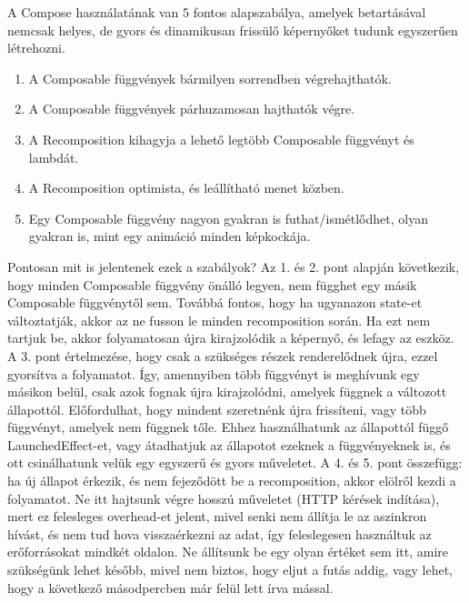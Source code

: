A Compose használatának van 5 fontos alapszabálya, amelyek betartásával nemcsak helyes, de gyors és dinamikusan frissülő képernyőket tudunk egyszerűen létrehozni.  
\begin{enumerate}
    \item A Composable függvények bármilyen sorrendben végrehajthatók.  
    \item A Composable függvények párhuzamosan hajthatók végre.  
    \item A Recomposition kihagyja a lehető legtöbb Composable függvényt és lambdát.  
    \item A Recomposition optimista, és leállítható menet közben.  
    \item Egy Composable függvény nagyon gyakran is futhat/ismétlődhet, olyan gyakran is, mint egy animáció minden képkockája.  
\end{enumerate}

Pontosan mit is jelentenek ezek a szabályok?
Az 1. és 2. pont alapján következik, hogy minden Composable függvény önálló legyen, nem függhet egy másik Composable függvénytől sem.  
Továbbá fontos, hogy ha ugyanazon state-et változtatják, akkor az ne fusson le minden recomposition során. Ha ezt nem tartjuk be, akkor folyamatosan újra kirajzolódik a képernyő, és lefagy az eszköz.  
A 3. pont értelmezése, hogy csak a szükséges részek renderelődnek újra, ezzel gyorsítva a folyamatot. Így, amennyiben több függvényt is meghívunk egy másikon belül, csak azok fognak újra kirajzolódni, amelyek függnek a változott állapottól.  
Előfordulhat, hogy mindent szeretnénk újra frissíteni, vagy több függvényt, amelyek nem függnek tőle. Ehhez használhatunk az állapottól függő LaunchedEffect-et, vagy átadhatjuk az állapotot ezeknek a függvényeknek is, és ott csinálhatunk velük egy egyszerű és gyors műveletet.  
A 4. és 5. pont összefügg: ha új állapot érkezik, és nem fejeződött be a recomposition, akkor elölről kezdi a folyamatot. Ne itt hajtsunk végre hosszú műveletet (HTTP kérések indítása), mert ez felesleges overhead-et jelent, mivel senki nem állítja le az aszinkron hívást, és nem tud hova visszaérkezni az adat, így feleslegesen használtuk az erőforrásokat mindkét oldalon.  
Ne állítsunk be egy olyan értéket sem itt, amire szükségünk lehet később, mivel nem biztos, hogy eljut a futás addig, vagy lehet, hogy a következő másodpercben már felül lett írva mással.

